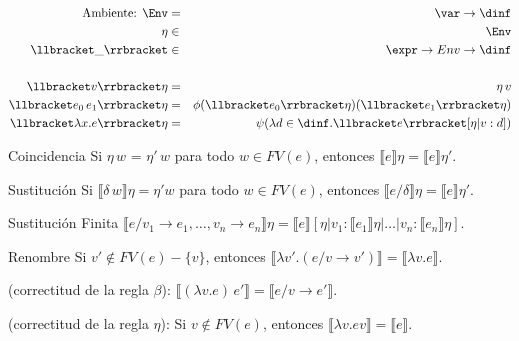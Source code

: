       \begin{eqnarray*}
        \text{Ambiente: } \Env &=& \var \to \dinf \\
        \eta &\in& \Env \\
        \llbracket\_\rrbracket &\in& \expr \to  Env \to  \dinf \\ \\
        \llbracket v\rrbracket\eta &=& \eta\, v \\
        \llbracket e_0\, e_1\rrbracket\eta &=& \phi(\llbracket e_0\rrbracket \eta) (\llbracket e_1\rrbracket\eta) \\
        \llbracket\lambda x.e\rrbracket\eta &=& \psi(\lambda d \in \dinf. \llbracket e\rrbracket[\eta |v:d]) \\
      \end{eqnarray*}        
        
    \begin{theorem}{Coincidencia} Si $\eta\, w$ = $\eta'\, w$ para todo $w \in FV(e)$,
      entonces $\llbracket e\rrbracket \eta = \llbracket e\rrbracket \eta'$.
    \end{theorem}
        
    \begin{theorem}{Sustitución} Si $\llbracket \delta\, w\rrbracket\eta = \eta' w$ para todo
      $w \in FV(e)$, entonces $\llbracket e/\delta\rrbracket \eta =\llbracket e\rrbracket\eta'$.
    \end{theorem}
    
    \begin{theorem}{Sustitución Finita} $\llbracket e/v_1\to e_1, \ldots,
      v_n\to e_n\rrbracket\eta = \llbracket e\rrbracket[\eta|v_1:
      \llbracket e_1\rrbracket\eta|\ldots|v_n:\llbracket e_n\rrbracket\eta]$.
    \end{theorem}
    
    \begin{theorem}{Renombre} Si $v' \not\in FV(e)-\{v\}$, entonces
      $\llbracket\lambda v'.(e/v\to v')\rrbracket = \llbracket\lambda
      v.e\rrbracket$.
    \end{theorem}
        
    \begin{property}(correctitud de la regla $\beta$): $\llbracket(\lambda v.e)\, e'\rrbracket = \llbracket e/v\to e'\rrbracket$.
    \end{property}
        
    \begin{property}
      (correctitud de la regla $\eta$): Si $v \not\in FV(e)$, entonces
      $\llbracket\lambda v.e v\rrbracket = \llbracket e\rrbracket$.
    \end{property}

